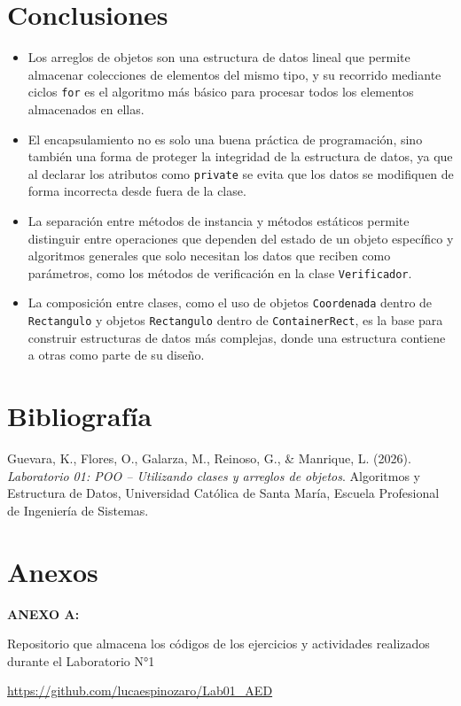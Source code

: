 \documentclass[12pt]{article}
\begin{document}
\section{Conclusiones}
\begin{itemize}

    \item Los arreglos de objetos son una estructura de datos 
    lineal que permite almacenar colecciones de elementos del 
    mismo tipo, y su recorrido mediante ciclos \texttt{for} 
    es el algoritmo más básico para procesar todos los 
    elementos almacenados en ellas.

    \item El encapsulamiento no es solo una buena práctica de 
    programación, sino también una forma de proteger la 
    integridad de la estructura de datos, ya que al declarar 
    los atributos como \texttt{private} se evita que los datos 
    se modifiquen de forma incorrecta desde fuera de la clase.

    \item La separación entre métodos de instancia y métodos 
    estáticos permite distinguir entre operaciones que dependen 
    del estado de un objeto específico y algoritmos generales 
    que solo necesitan los datos que reciben como parámetros, 
    como los métodos de verificación en la clase 
    \texttt{Verificador}.

    \item La composición entre clases, como el uso de objetos 
    \texttt{Coordenada} dentro de \texttt{Rectangulo} y 
    objetos \texttt{Rectangulo} dentro de 
    \texttt{ContainerRect}, es la base para construir 
    estructuras de datos más complejas, donde una estructura 
    contiene a otras como parte de su diseño.
\end{itemize}


\section{Bibliografía}
     Guevara, K., Flores, O., Galarza, M., Reinoso, G., 
    \& Manrique, L. (2026). \textit{Laboratorio 01: POO -- 
    Utilizando clases y arreglos de objetos}. Algoritmos y 
    Estructura de Datos, Universidad Católica de Santa María, 
    Escuela Profesional de Ingeniería de Sistemas.


\section{Anexos}

\begin{center}
\centering\textbf{ANEXO A:}\\
\end{center}
Repositorio que almacena los códigos de los ejercicios y actividades realizados durante
el Laboratorio N°1

\noindent\url{https://github.com/lucaespinozaro/Lab01_AED}

    
\end{document}
